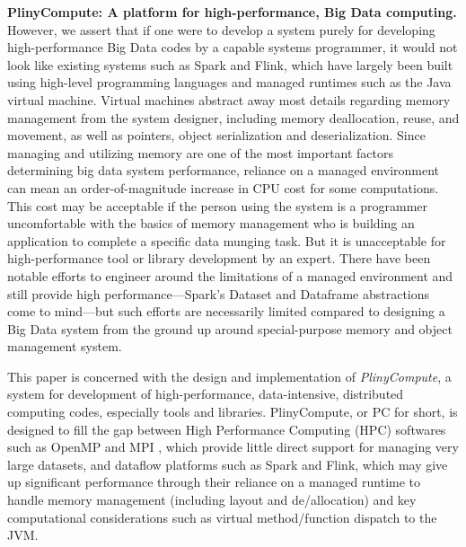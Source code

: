 \vspace{5 pt}
\noindent
\textbf{PlinyCompute: A platform for high-performance, Big Data computing.}
However, we assert that if one were to develop a system purely for developing high-performance
Big Data codes
by a capable systems programmer,
it would not look like existing systems such as Spark and Flink,
which have largely 
been built using high-level programming languages and managed runtimes such as the Java 
virtual machine.  Virtual machines abstract away
most details regarding memory management
from the system designer, including memory deallocation, reuse, and movement, as well as pointers,
object serialization and deserialization.
Since managing and utilizing memory are 
one of the most important factors determining big data system performance, reliance
on a managed environment can mean an order-of-magnitude increase in CPU cost for some computations.  
This cost may be acceptable if the person using the system
is a programmer uncomfortable with the basics of memory management who is
building an application to complete a specific data munging task.  
But it is unacceptable for high-performance tool or library
development by an expert. There have been notable efforts to engineer around the limitations of a managed environment and still provide
high performance---Spark's Dataset and
Dataframe abstractions come to mind---but such efforts are necessarily limited compared to
designing a Big Data system from the ground up around special-purpose
memory and object management system.

This paper is concerned with the design and implementation of
\emph{PlinyCompute}, a system for development of
high-performance, data-intensive, distributed computing codes, especially tools and libraries.
PlinyCompute, or PC for short, is designed to fill the gap between
High Performance Computing (HPC) softwares such as OpenMP \cite{dagum1998openmp} and MPI \cite{gropp1996high}, which provide little direct support for
managing very large datasets, and dataflow platforms such as Spark and Flink, which 
may give up significant performance through their reliance on a managed runtime to handle
memory management (including layout and de/allocation) and key computational considerations
such as virtual method/function dispatch to the JVM. 

